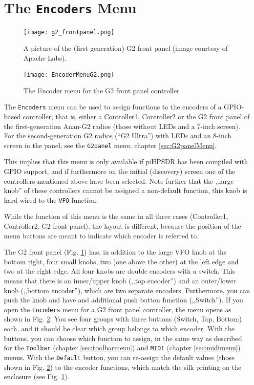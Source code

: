 \documentclass[12pt]{book}
\def\rett#1{\texttt{\color{red}#1}}
\def\bltt#1{\texttt{\color{blue}#1}}
\def\pH{pi\-HPSDR\xspace}
\begin{document}
\section{The \texttt{Encoders} Menu}
\begin{figure}[ht!]
\center
\texttt{[image: g2\_frontpanel.png]}
\caption{A picture of the (first generation) G2 front panel (image courtesy of Apache Labs).}
\label{fig:g2_frontpanel}
\end{figure}

\begin{figure}[ht]
\center
\texttt{[image: EncoderMenuG2.png]}
\caption{The Encoder menu for the G2 front panel controller}
\label{fig:EncoderMenuG2}
\end{figure}
The \bltt{Encoders} menu can be used to assign functions to the encoders of a
GPIO-based controller, that is, either a
Controller1, Controller2 or the G2 front panel of the first-generation Anan-G2 radios
(those without LEDs and a 7-inch screen). For the second-generation G2 radios
(``G2 Ultra'') with LEDs and an 8-inch screen in the panel, see the \bltt{G2panel}
menu, chapter \ref{sec:G2panelMenu}.

This implies that this menu is only available if \pH has been compiled with GPIO support,
and if furthermore on the initial (discovery) screen one of the controllers mentioned above have
been selected. Note further that the ,,large knob'' of these controllers
cannot be assigned a non-default function, this knob is hard-wired to the \bltt{VFO} function.


While the function of this menu is the same in all three cases (Controller1, Controller2,
G2 front panel), the layout is different, because the position of the menu buttons
are meant to indicate which encoder is referred to.



The G2 front panel (Fig. \ref{fig:g2_frontpanel}) has,
in addition to the large VFO knob at the bottom right,
four small knobs, two (one above the other)
at the left edge and two at the right edge. All four knobs are double encoders with
a switch. This means that there is an inner/upper knob (,,top encoder'')
and an outer/lower knob (,,bottom encoder''), which
are two separate encoders. Furthermore, you can push the knob and have and additional
push button function (,,Switch''). If you open the \bltt{Encoders} menu for
a G2 front panel controller, the menu opens as shown in Fig. \ref{fig:EncoderMenuG2}.
You see four groups with three buttons (Switch, Top, Bottom) each, and it should be
clear which group belongs to which encoder. With the buttons, you can choose which function
to assign, in the same way as described for the \bltt{Toolbar} (chapter \ref{sec:toolbarmenu})
and \bltt{MIDI} (chapter \ref{sec:midimenu}) menus. With the \rett{Default} button, you can
re-assign the default values (those shown in Fig. \ref{fig:EncoderMenuG2})
to the encoder functions, which match the silk printing
on the enclosure (see Fig. \ref{fig:g2_frontpanel}).
\end{document}
